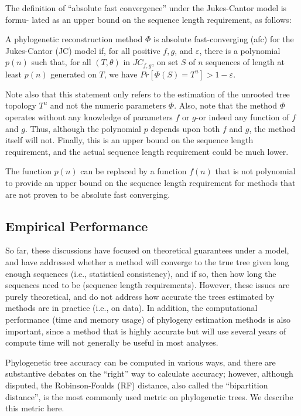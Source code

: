 The definition of ``absolute fast convergence'' under the Jukes-Cantor 
model is formu- lated as an upper bound on the sequence length requirement, 
as follows:

\begin{defn}
A phylogenetic reconstruction method $\Phi$ is absolute fast-converging (afc) 
for the Jukes-Cantor (JC) model if, for all positive $f,g$, and $\varepsilon$, 
there is a polynomial $p(n)$ such that, for all $(T,\theta)$ in $JC_{f,g}$, 
on set $S$ of $n$ sequences of length at least $p(n)$ generated on $T$, 
we have $Pr[\Phi(S) = T^u] > 1 - \varepsilon$.
\end{defn}

Note also that this statement only refers to the estimation of the unrooted 
tree topology $T^u$ and not the numeric parameters $\Phi$. Also, note that 
the method $\Phi$ operates without any knowledge of parameters $f$ or $g$-or 
indeed any function of $f$ and $g$. Thus, although the polynomial $p$ 
depends upon both $f$ and $g$, the method itself will not. Finally, this 
is an upper bound on the sequence length requirement, and the actual 
sequence length requirement could be much lower. 

The function $p(n)$ can be replaced by a function $f(n)$ that is not 
polynomial to provide an upper bound on the sequence length requirement 
for methods that are not proven to be absolute fast converging. 

\subsection{Empirical Performance}
So far, these discussions have focused on theoretical guarantees under a model, 
and have addressed whether a method will converge to the true tree given 
long enough sequences (i.e., statistical consistency), and if so, then 
how long the sequences need to be (sequence length requirements). However, 
these issues are purely theoretical, and do not address how accurate the 
trees estimated by methods are in practice (i.e., on data). In addition, 
the computational performance (time and memory usage) of phylogeny estimation 
methods is also important, since a method that is highly accurate but will 
use several years of compute time will not generally be useful in most analyses. 

Phylogenetic tree accuracy can be computed in various ways, and there are 
substantive debates on the ``right'' way to calculate accuracy; however, 
although disputed, the Robinson-Foulds (RF) distance, also called the 
``bipartition distance'', is the most commonly used metric on phylogenetic trees. 
We describe this metric here. 

